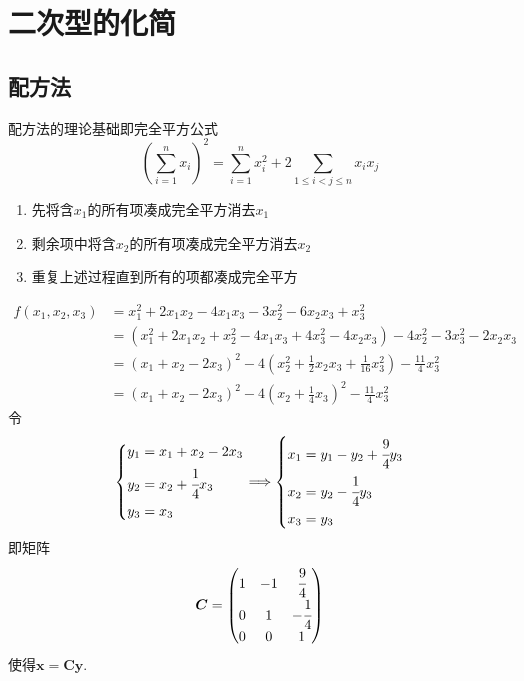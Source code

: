 \section{二次型的化简}
\subsection{配方法}
配方法的理论基础即完全平方公式\[
\left(
    \sum_{i=1}^{n}x_i
\right)^2=\sum_{i=1}^{n}x_i^2+2\sum_{1\leqslant i<j\leqslant n}x_ix_j
\]\begin{enumerate}[label={\textup{(\arabic*)}}]
    \item 先将含$x_1$的所有项凑成完全平方消去$x_1$
    \item 剩余项中将含$x_2$的所有项凑成完全平方消去$x_2$
    \item 重复上述过程直到所有的项都凑成完全平方 
\end{enumerate}
\begin{brown}
    \begin{example}
        \begin{align*}
            f\left(
            x_1,x_2,x_3
        \right)&=x_1^2+2x_1x_2-4x_1x_3-3x_2^2-6x_2x_3+x_3^2\\
        &=\left(
            x_1^2+2x_1x_2+x_2^2-4x_1x_3+4x_3^2-4x_2x_3
        \right)-4x_2^2-3x_3^2-2x_2x_3\\
        &=\left(x_1+x_2-2x_3\right)^2-4\left(
            x_2^2+\frac{1}{2}x_2x_3+\frac{1}{16}x_3^2
        \right)-\frac{11}{4}x_3^2\\
        &=\left(x_1+x_2-2x_3\right)^2-4\left(
            x_2+\frac{1}{4}x_3
        \right)^2-\frac{11}{4}x_3^2
        \end{align*}令\[
        \begin{cases*}
            y_1=x_1+x_2-2x_3\\
            y_2=x_2+\cfrac{1}{4}x_3\\
            y_3=x_3
        \end{cases*}\Longrightarrow\begin{cases*}
            x_1=y_1-y_2+\cfrac{9}{4}y_3\\
            x_2=y_2-\cfrac{1}{4}y_3\\
            x_3=y_3
        \end{cases*}
        \]即矩阵\[
        \bm{C}=\begin{pmatrix}
            1&-1&\cfrac{9}{4}\\
            0&1&-\cfrac{1}{4}\\
            0&0&1
        \end{pmatrix}
        \]使得$\bm{x}=\bm{Cy}.$
    \end{example}
\end{brown}
